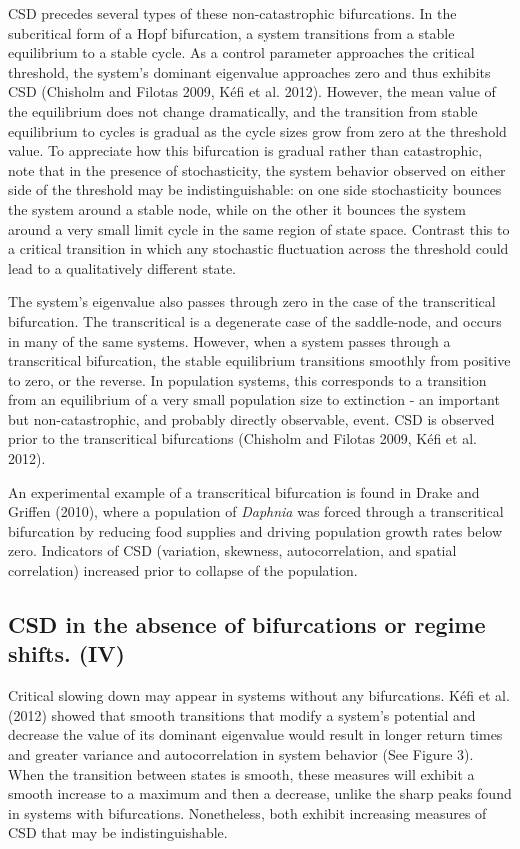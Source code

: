 \documentclass{article}
\begin{document}
CSD precedes several types of these non-catastrophic bifurcations. In
the subcritical form of a Hopf bifurcation, a system transitions from a
stable equilibrium to a stable cycle. As a control parameter approaches
the critical threshold, the system's dominant eigenvalue approaches zero
and thus exhibits CSD (Chisholm and Filotas 2009, Kéfi et al. 2012).
However, the mean value of the equilibrium does not change dramatically,
and the transition from stable equilibrium to cycles is gradual as the
cycle sizes grow from zero at the threshold value. To appreciate how
this bifurcation is gradual rather than catastrophic, note that in the
presence of stochasticity, the system behavior observed on either side
of the threshold may be indistinguishable: on one side stochasticity
bounces the system around a stable node, while on the other it bounces
the system around a very small limit cycle in the same region of state
space. Contrast this to a critical transition in which any stochastic
fluctuation across the threshold could lead to a qualitatively different
state.

The system's eigenvalue also passes through zero in the case of the
transcritical bifurcation. The transcritical is a degenerate case of the
saddle-node, and occurs in many of the same systems. However, when a
system passes through a transcritical bifurcation, the stable
equilibrium transitions smoothly from positive to zero, or the reverse.
In population systems, this corresponds to a transition from an
equilibrium of a very small population size to extinction - an important
but non-catastrophic, and probably directly observable, event. CSD is
observed prior to the transcritical bifurcations (Chisholm and Filotas
2009, Kéfi et al. 2012).

An experimental example of a transcritical bifurcation is found in Drake
and Griffen (2010), where a population of \emph{Daphnia} was forced
through a transcritical bifurcation by reducing food supplies and
driving population growth rates below zero. Indicators of CSD
(variation, skewness, autocorrelation, and spatial correlation)
increased prior to collapse of the population.

\subsection{CSD in the absence of bifurcations or regime shifts. (IV)}

Critical slowing down may appear in systems without any bifurcations.
Kéfi et al. (2012) showed that smooth transitions that modify a system's
potential and decrease the value of its dominant eigenvalue would result
in longer return times and greater variance and autocorrelation in
system behavior (See Figure 3). When the transition between states is
smooth, these measures will exhibit a smooth increase to a maximum and
then a decrease, unlike the sharp peaks found in systems with
bifurcations. Nonetheless, both exhibit increasing measures of CSD that
may be indistinguishable.
\end{document}
